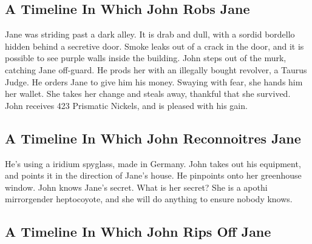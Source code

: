\documentclass{article}
\begin{document}
\subsection{A Timeline In Which John Robs Jane}


Jane was striding past a dark alley.
It is drab and dull, with a sordid bordello hidden behind a secretive door.
Smoke leaks out of a crack in the door, and it is possible to see purple walls inside the building.
John steps out of the murk, catching Jane off{-}guard.
He prods her with an illegally bought revolver, a Taurus Judge.
He orders Jane to give him his money.
Swaying with fear, she hands him her wallet.
She takes her change and steals away, thankful that she survived.
John receives 423 Prismatic Nickels, and is pleased with his gain.
\subsection{A Timeline In Which John Reconnoitres Jane}


He's using a iridium spyglass, made in Germany.
John takes out his equipment, and points it in the direction of Jane's house. He pinpoints onto her greenhouse window.
John knows Jane's secret. What is her secret? She is a apothi mirrorgender heptocoyote, and she will do anything to ensure nobody knows.
\subsection{A Timeline In Which John Rips Off Jane}
\end{document}
